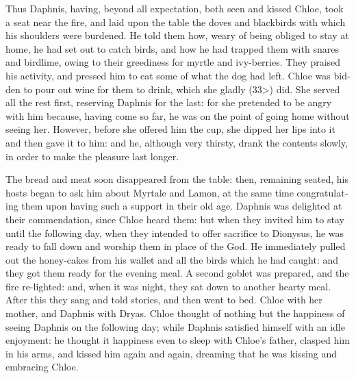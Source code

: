 \documentclass{book}
\begin{document}
\begin{pairs}
\begin{Rightside}
\begin{english}
  Thus Daphnis, having, beyond all expectation, both seen and kissed Chloe, took a seat near the fire, and laid upon the table the doves and blackbirds with which his shoulders were burdened.  He told them how, weary of being obliged to stay at home, he had set out to catch birds, and how he had trapped them with snares and birdlime, owing to their greediness for myrtle and ivy-berries.  They praised his activity, and pressed him to eat some of what the dog had left.  Chloe was bidden to pour out wine for them to drink, which she gladly (33>) did.  She served all the rest first, reserving Daphnis for the last: for she pretended to be angry with him because, having come so far, he was on the point of going home without seeing her.  However, before she offered him the cup, she dipped her lips into it and then gave it to him: and he, although very thirsty, drank the contents slowly, in order to make the pleasure last longer.
\pend


  The bread and meat soon disappeared from the table: then, remaining seated, his hosts began to ask him about Myrtale and Lamon, at the same time congratulating them upon having such a support in their old age.  Daphnis was delighted at their commendation, since Chloe heard them: but when they invited him to stay until the following day, when they intended to offer sacrifice to Dionysus, he was ready to fall down and worship them in place of the God.  He immediately pulled out the honey-cakes from his wallet and all the birds which he had caught: and they got them ready for the evening meal.  A second goblet was prepared, and the fire re-lighted: and, when it was night, they sat down to another hearty meal.  After this they sang and told stories, and then went to bed.  Chloe with her mother, and Daphnis with Dryas.  Chloe thought of nothing but the happiness of seeing Daphnis on the following day; while Daphnis satisfied himself with an idle enjoyment: he thought it happiness even to sleep with Chloe's father, clasped him in his arms, and kissed him again and again, dreaming that he was kissing and embracing Chloe.
\pend



\end{english}
\end{Rightside}
\end{pairs}
\end{document}
